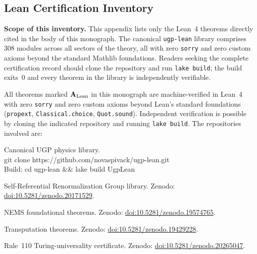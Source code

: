 \documentclass[11pt,openany]{book}
\theoremstyle{remark}
\newcommand{\CatAL}{\ensuremath{\textbf{A}_{\rm Lean}}}
\begin{document}
\begin{appendices}

\chapter[Lean Certification]{Lean Certification Inventory}
\label{app:lean}

\textbf{Scope of this inventory.}
This appendix lists only the Lean~4 theorems directly cited in the body of this monograph.
The canonical \texttt{ugp-lean} library comprises 308 modules across all sectors of the theory,
all with zero \texttt{sorry} and zero custom axioms beyond the standard Mathlib foundations.
Readers seeking the complete certification record should clone the repository and run
\texttt{lake build}; the build exits~0 and every theorem in the library is independently verifiable.

\medskip
All theorems marked \CatAL{} in this monograph are machine-verified in Lean~4
with zero \texttt{sorry} and zero custom axioms beyond Lean's standard foundations
(\texttt{propext}, \texttt{Classical.choice}, \texttt{Quot.sound}).  Independent
verification is possible by cloning the indicated repository and running
\texttt{lake build}.  The repositories involved are:

\begin{description}[noitemsep,topsep=4pt]
\item[\texttt{ugp-lean}] Canonical UGP physics library.\\
  {\small\ttfamily git clone https://github.com/\allowbreak novaspivack/\allowbreak ugp-lean.git}\\
  Build: {\small\ttfamily cd ugp-lean \&\& lake build UgpLean}
\item[\texttt{srrg-lean}] Self-Referential Renormalization Group library.
  Zenodo: \href{https://zenodo.org/records/20171529}{doi:10.5281/zenodo.20171529}.
\item[\texttt{nems-lean}] NEMS foundational theorems.
  Zenodo: \href{https://zenodo.org/records/19574765}{doi:10.5281/zenodo.19574765}.
\item[\texttt{transputation-lean}] Transputation theorems.
  Zenodo: \href{https://zenodo.org/records/19429228}{doi:10.5281/zenodo.19429228}.
\item[\texttt{rule110-lean}] Rule~110 Turing-universality certificate.
  Zenodo: \href{https://zenodo.org/records/20265047}{doi:10.5281/zenodo.20265047}.
\end{description}


\end{appendices}
\end{document}
